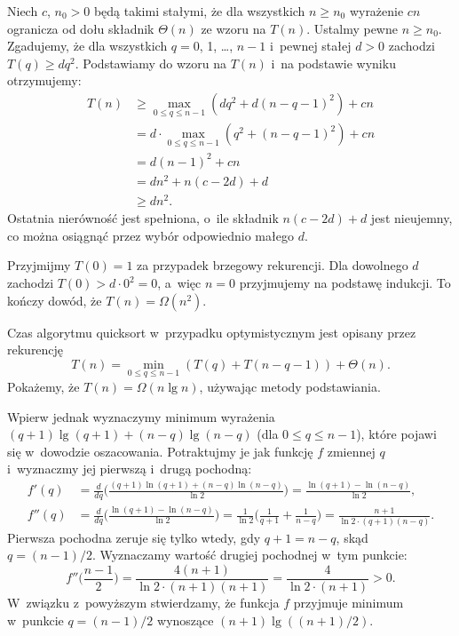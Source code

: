 
\exercise %
Niech $c$, $n_0>0$ będą takimi stałymi, że dla wszystkich $n\ge n_0$ wyrażenie $cn$ ogranicza od dołu składnik $\Theta(n)$ ze wzoru na $T(n)$.
Ustalmy pewne $n\ge n_0$.
Zgadujemy, że dla wszystkich $q=0$, 1, \dots, $n-1$ i~pewnej stałej $d>0$ zachodzi $T(q)\ge dq^2$.
Podstawiamy do wzoru na $T(n)$ i~na podstawie wyniku  otrzymujemy:
\begin{align*}
	T(n) &\ge \max_{0\le q\le n-1}(dq^2+d(n-q-1)^2)+cn \\
	&= d\cdot\!\!\!\max_{0\le q\le n-1}(q^2+(n-q-1)^2)+cn \\
	&= d(n-1)^2+cn \\
	&= dn^2+n(c-2d)+d \\
	&\ge dn^2.
\end{align*}
Ostatnia nierówność jest spełniona, o~ile składnik $n(c-2d)+d$ jest nieujemny, co można osiągnąć przez wybór odpowiednio małego $d$.

Przyjmijmy $T(0)=1$ za przypadek brzegowy rekurencji.
Dla dowolnego $d$ zachodzi $T(0)>d\cdot0^2=0$, a~więc $n=0$ przyjmujemy na podstawę indukcji.
To kończy dowód, że $T(n)=\Omega(n^2)$.

\exercise %
Czas algorytmu quicksort w~przypadku optymistycznym jest opisany przez rekurencję
\[
    T(n) = \min_{0\le q\le n-1}(T(q)+T(n-q-1))+\Theta(n).
\]
Pokażemy, że $T(n)=\Omega(n\lg n)$, używając metody podstawiania.

Wpierw jednak wyznaczymy minimum wyrażenia $(q+1)\lg(q+1)+(n-q)\lg(n-q)$ (dla $0\le q\le n-1$), które pojawi się w~dowodzie oszacowania.
Potraktujmy je jak funkcję $f$ zmiennej $q$ i~wyznaczmy jej pierwszą i~drugą pochodną:
\begin{align*}
    f'(q) &= \frac{d}{dq}\biggl(\frac{(q+1)\ln(q+1)+(n-q)\ln(n-q)}{\ln2}\biggr) = \frac{\ln(q+1)-\ln(n-q)}{\ln2}, \\[1mm]
	f''(q) &= \frac{d}{dq}\biggl(\frac{\ln(q+1)-\ln(n-q)}{\ln2}\biggr) = \frac{1}{\ln2}\biggl(\frac{1}{q+1}+\frac{1}{n-q}\biggr) = \frac{n+1}{\ln2\cdot(q+1)(n-q)}.
\end{align*}
Pierwsza pochodna zeruje się tylko wtedy, gdy $q+1=n-q$, skąd $q=(n-1)/2$.
Wyznaczamy wartość drugiej pochodnej w~tym punkcie:
\[
    f''\biggl(\frac{n-1}{2}\biggr) = \frac{4(n+1)}{\ln2\cdot(n+1)(n+1)} = \frac{4}{\ln2\cdot(n+1)} > 0.
\]
W~związku z~powyższym stwierdzamy, że funkcja $f$ przyjmuje minimum w~punkcie $q=(n-1)/2$ wynoszące $(n+1)\lg((n+1)/2)$.

